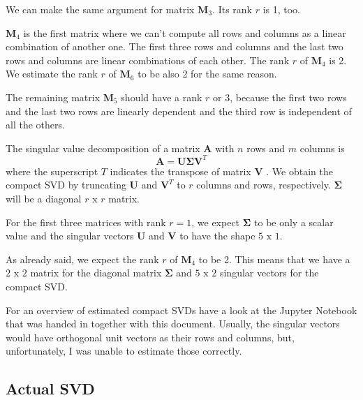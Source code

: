 \documentclass{support/acm_proc_article-sp}
\begin{document}
    We can make the same argument for matrix $\mathbf{M}_3$.
    Its rank $r$ is 1, too.

    $\mathbf{M}_4$ is the first matrix where we can't compute all rows and columns as a linear combination of another
    one.
    The first three rows and columns and the last two rows and columns are linear combinations of each other.
    The rank $r$ of $\mathbf{M}_4$ is 2.
    We estimate the rank $r$ of $\mathbf{M}_6$ to be also 2 for the same reason.

    The remaining matrix $\mathbf{M}_5$ should have a rank $r$ or 3, because the first two rows and the last two rows
    are linearly dependent and the third row is independent of all the others.

    The singular value decomposition of a matrix $\mathbf{A}$ with $n$ rows and $m$ columns is
    \begin{equation*}
        \mathbf{A} = \mathbf{U}\mathbf{\Sigma}\mathbf{V}^T
    \end{equation*}
    where the superscript $T$ indicates the transpose of matrix $\mathbf{V}$ \cite[p. 49]{skillicorn2007}.
    We obtain the compact SVD by truncating $\mathbf{U}$ and $\mathbf{V}^T$ to $r$ columns and rows, respectively.
    $\mathbf{\Sigma}$ will be a diagonal $r \mbox{ x } r$ matrix.

    For the first three matrices with rank $r = 1$, we expect $\mathbf{\Sigma}$ to be only a scalar value and the singular
    vectors $\mathbf{U}$ and $\mathbf{V}$ to have the shape $5 \mbox{ x } 1$.

    As already said, we expect the rank $r$ of $\mathbf{M}_4$ to be 2.
    This means that we have a $2 \mbox{ x } 2$ matrix for the diagonal matrix $\mathbf{\Sigma}$ and $5 \mbox{ x } 2$
    singular vectors for the compact SVD\@.

    For an overview of estimated compact SVDs have a look at the Jupyter Notebook that was handed in together with
    this document.
    Usually, the singular vectors would have orthogonal unit vectors as their rows and columns, but, unfortunately,
    I was unable to estimate those correctly.


    \subsection{Actual SVD}
\end{document}
